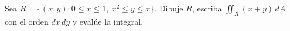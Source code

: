 Sea $R=\{(x,y):0\leq x\leq1,\ x^2\leq y\leq x\}$. Dibuje $R$, escriba $\iint_R(x+y)\,dA$ con el orden $dx\,dy$ y evalúe la integral.
